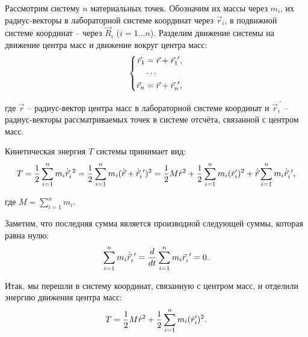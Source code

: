 \documentclass[12pt]{article}
\begin{document}
\hspace{0.35cm} Рассмотрим систему $n$ материальных точек. Обозначим их массы через $m_i$, их радиус-векторы в лабораторной системе координат через $\vec{r}_i$, в подвижной системе координат -- через $\vec{R}_i$ ($i = 1 \dots n$). Разделим движение системы на движение центра масс и движение вокруг центра масс:
\vspace*{-0.1cm}
\begin{gather}
\left\{
\begin{aligned}
\vec{r}_1 &= \vec{r} + \vec{r}_1^{\ \prime}, \\
&\cdots \\
\vec{r}_n &= \vec{r} + \vec{r}_n^{\ \prime},
\end{aligned}
\right. \notag
\end{gather}

\hspace*{-0.75cm} где $\vec{r}$ -- радиус-вектор центра масс в лабораторной системе координат и $\vec{r}_i^{\ \prime}$ -- радиус-векторы рассматриваемых точек в системе отсчёта, связанной с центром масс.

Кинетическая энергия $T$ системы принимает вид: 
\vspace*{-0.1cm}
\begin{gather}
T = \frac{1}{2} \sum_{i=1}^{n} m_i \dot{\vec{r}}_i^{\ 2} = \frac{1}{2} \sum_{i=1}^{n} m_i (\dot{\vec{r}} + \dot{\vec{r}}_i^{\ \prime})^2  = \frac{1}{2} M \dot{r}^2 + \frac{1}{2} \sum_{i=1}^{n} m_i ( \dot{r}_i^\prime)^2 + \dot{\vec{r}} \sum_{i=1}^{n} m_i \dot{\vec{r}}_i^{\ \prime}, \notag
\end{gather}

\hspace*{-0.75cm} где $M = \sum_{i=1}^{n} m_i$.

Заметим, что последняя сумма является производной следующей суммы, которая равна нулю: 
\vspace*{-0.1cm}
\begin{gather}
\sum_{i=1}^{n} m_i \dot{\vec{r}}_i^{\ \prime} = \frac{d}{dt} \sum_{i=1}^{n} m_i \vec{r}_i^{\ \prime} = 0. \notag
\end{gather}

Итак, мы перешли в систему координат, связанную с центром масс, и отделили энергию движения центра масс:
\vspace*{-0.1cm}
\begin{gather}
T = \frac{1}{2} M \dot{r}^2 + \frac{1}{2} \sum_{i=1}^{n} m_i( \dot{r}_i^\prime)^2. \notag
\end{gather}
\end{document}
